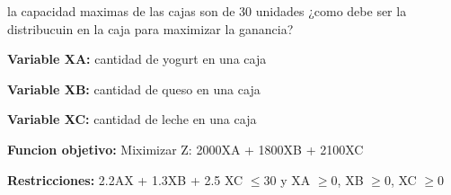 \documentclass{article}
\begin{document}
\large la capacidad maximas de las cajas son de 30 unidades ¿como debe ser la distribucuin en la caja para maximizar la ganancia?

\begin{center}
    \item \textbf{Variable XA:} cantidad de yogurt en una caja
    \item \textbf{Variable XB:} cantidad de queso en una caja
    \item \textbf{Variable XC:} cantidad de leche en una caja
    \item \textbf{Funcion objetivo:} Miximizar Z: 2000XA + 1800XB + 2100XC
    \item \large \textbf{Restricciones:} 2.2AX + 1.3XB + 2.5 XC $ \leq 30$ y XA  $ \geq 0$, XB  $ \geq 0$, XC  $ \geq 0$
\end{center}
\end{document}
